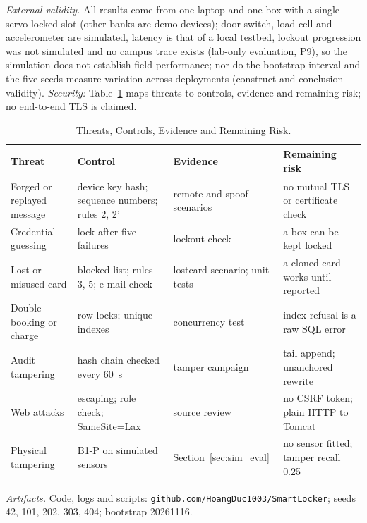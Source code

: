 \documentclass[journal,onecolumn]{IEEEtran}
\begin{document}
\textit{External validity.} All results come from one laptop and one box with a single servo-locked slot (other
banks are demo devices); door switch, load cell and accelerometer are simulated, latency is that of a local testbed,
lockout progression was not simulated and no campus trace exists (lab-only evaluation, P9), so the simulation does
not establish field performance; nor do the bootstrap interval and the five seeds measure variation across deployments
(construct and conclusion validity). \textit{Security:} Table~\ref{tab:threats} maps threats to controls, evidence and
remaining risk; no end-to-end TLS is claimed.

\begin{table}[!htbp]
\renewcommand{\arraystretch}{1.02}
\centering
\footnotesize
\caption{Threats, Controls, Evidence and Remaining Risk.}
\label{tab:threats}
\vspace{2pt}
\begin{tabular}{>{\raggedright\arraybackslash}p{3.3cm} >{\raggedright\arraybackslash}p{4.6cm} >{\raggedright\arraybackslash}p{3.5cm} >{\raggedright\arraybackslash}p{4.8cm}}
\hline
Threat & Control & Evidence & Remaining risk \\
\hline
\rule{0pt}{2.4ex}Forged or replayed message & device key hash; sequence numbers; rules 2, 2' & remote and spoof scenarios & no mutual TLS or certificate check \\
Credential guessing & lock after five failures & lockout check & a box can be kept locked \\
Lost or misused card & blocked list; rules 3, 5; e-mail check & lostcard scenario; unit tests & a cloned card works until reported \\
Double booking or charge & row locks; unique indexes & concurrency test & index refusal is a raw SQL error \\
Audit tampering & hash chain checked every 60~s & tamper campaign & tail append; unanchored rewrite \\
Web attacks & escaping; role check; SameSite=Lax & source review & no CSRF token; plain HTTP to Tomcat \\
Physical tampering & B1-P on simulated sensors & Section~\ref{sec:sim_eval} & no sensor fitted; tamper recall 0.25 \\
\hline
\end{tabular}
\end{table}

\textit{Artifacts.} Code, logs and scripts: \texttt{github.com/HoangDuc1003/SmartLocker}; seeds 42, 101, 202, 303, 404; bootstrap 20261116.
\end{document}

